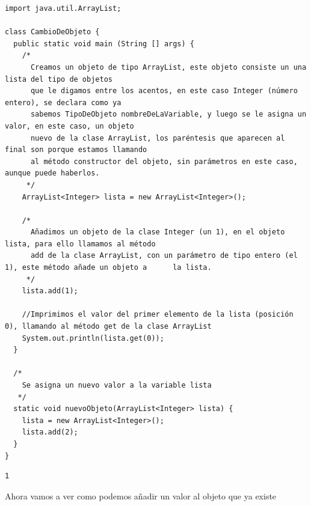 \documentclass[11pt]{article}
\begin{document}
\begin{verbatim}
import java.util.ArrayList;

class CambioDeObjeto {
  public static void main (String [] args) {
    /*
      Creamos un objeto de tipo ArrayList, este objeto consiste un una lista del tipo de objetos
      que le digamos entre los acentos, en este caso Integer (número entero), se declara como ya
      sabemos TipoDeObjeto nombreDeLaVariable, y luego se le asigna un valor, en este caso, un objeto
      nuevo de la clase ArrayList, los paréntesis que aparecen al final son porque estamos llamando
      al método constructor del objeto, sin parámetros en este caso, aunque puede haberlos.
     */
    ArrayList<Integer> lista = new ArrayList<Integer>();

    /*
      Añadimos un objeto de la clase Integer (un 1), en el objeto lista, para ello llamamos al método
      add de la clase ArrayList, con un parámetro de tipo entero (el 1), este método añade un objeto a      la lista.
     */
    lista.add(1);

    //Imprimimos el valor del primer elemento de la lista (posición 0), llamando al método get de la clase ArrayList
    System.out.println(lista.get(0));
  }

  /*
    Se asigna un nuevo valor a la variable lista 
   */
  static void nuevoObjeto(ArrayList<Integer> lista) {
    lista = new ArrayList<Integer>();
    lista.add(2);
  }
}
\end{verbatim}

\begin{verbatim}
1
\end{verbatim}

Ahora vamos a ver como podemos añadir un valor al objeto que ya existe
\end{document}
